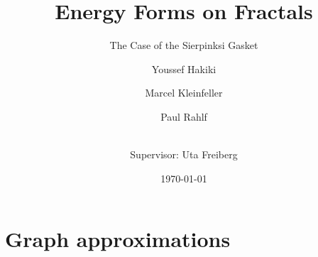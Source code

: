\documentclass[notheorems]{beamer}
\title{Energy Forms on Fractals}
\subtitle{The Case of the Sierpinksi Gasket}
\author{Youssef Hakiki \and Marcel Kleinfeller \and Paul Rahlf \and \\[3mm] {\small Supervisor: Uta Freiberg}}
\institute{ISem26 - Project D}
\date{\today}
\theoremstyle{definition}
\theoremstyle{plain}
\theoremstyle{remark}
\newcommand{\1}{\mathds{1}} %
\begin{document}
\begin{frame}
    \titlepage
\end{frame}


\section{Graph approximations}



\end{document}
